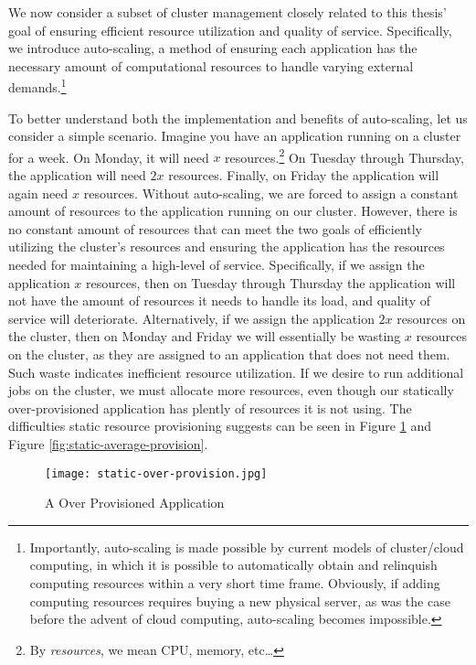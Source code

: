 We now consider a subset of cluster management closely related to
this thesis' goal of ensuring efficient resource utilization and quality of
service. Specifically, we introduce
auto-scaling, a method of ensuring each application has the necessary amount
of computational resources to handle varying external
demands.\footnote{Importantly, auto-scaling is
made possible by current models of cluster/cloud computing, in which it is
possible to automatically obtain and relinquish computing resources within a
very short time frame. Obviously, if adding computing resources requires buying
a new physical server, as was the case before the advent of cloud computing,
auto-scaling becomes impossible.}

To better understand both the implementation and benefits of auto-scaling, let
us consider a simple scenario. Imagine you have an application running on a
cluster for a week. On Monday, it will need $x$ resources.\footnote{By
  \textit{resources}, we mean CPU, memory, etc\ldots} On Tuesday through
Thursday, the application will need $2x$ resources. Finally, on Friday the
application will again need $x$ resources. Without auto-scaling, we are forced
to assign a constant amount of resources to the application running on our
cluster. However, there is no constant amount of resources that can meet
the two goals of efficiently utilizing the cluster's resources and ensuring the
application has the resources needed for maintaining a high-level of service.
Specifically, if we assign the application $x$ resources,
then on Tuesday through Thursday the
application will not have the amount of resources it needs to handle its load,
and quality of service will deteriorate. Alternatively, if we assign the
application $2x$ resources on the cluster, then on Monday and Friday we will
essentially be wasting $x$ resources on the cluster, as they are assigned to an
application that does not need them. Such waste indicates inefficient
resource utilization. If we desire to run additional jobs on the cluster, we
must allocate more resources, even though our statically over-provisioned
application has plently of resources it is not using.
The difficulties static resource provisioning suggests can
be seen in Figure \ref{fig:static-over-provision} and Figure
\ref{fig:static-average-provision}.

\begin{figure}[!h]
  \centerline{\texttt{[image: static-over-provision.jpg]}}
  \caption{A Over Provisioned Application}
  \label{fig:static-over-provision}
\end{figure}

